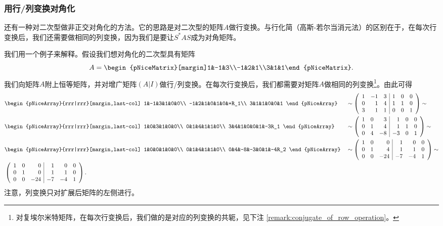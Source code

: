 \subsubsection{用行/列变换对角化}

还有一种对二次型做非正交对角化的方法。它的思路是对二次型的矩阵$A$做行变换。与行化简（高斯-若尔当消元法）的区别在于，在每次行变换后，我们还需要做相同的列变换，因为我们是要让$S^*AS$成为对角矩阵。

我们用一个例子来解释。假设我们想对角化的二次型具有矩阵\[A=\begin{pNiceMatrix}[margin]1&-1&3\\-1&2&1\\3&1&1\end{pNiceMatrix}.\]
我们向矩阵$A$附上恒等矩阵，并对增广矩阵$(A|I)$做行/列变换。在每次行变换后，我们都需要对矩阵$A$做相同的列变换\footnote{对复埃尔米特矩阵，在每次行变换后，我们做的是对应的列变换的共轭，见下注 \ref{remark:conjugate_of_row_operation}。}。由此可得
\begin{align*}
    &\begin{pNiceArray}{rrr|rrr}[margin,last-col]
  1&-1&3&1&0&0\\
  -1&2&1&0&1&0&+R_1\\
  3&1&1&0&0&1
\end{pNiceArray}  &&\sim \left(
  \begin{array}{rrr|rrr}
      1&-1&3&1&0&0\\
      0&1&4&1&1&0\\
      3&1&1&0&0&1
    \end{array}
  \right)\sim\\
    &\begin{pNiceArray}{rrr|rrr}[margin,last-col]
  1&0&3&1&0&0\\
  0&1&4&1&1&0\\
  3&4&1&0&0&1&-3R_1
\end{pNiceArray}  &&\sim \left(
  \begin{array}{rrr|rrr}
      1&0&3&1&0&0\\
      0&1&4&1&1&0\\
      0&4&-8&-3&0&1
    \end{array}
  \right)\sim\\
  &\begin{pNiceArray}{rrr|rrr}[margin,last-col]
  1&0&0&1&0&0\\
    0&1&4&1&1&0\\
    0&4&-8&-3&0&1&-4R_2
\end{pNiceArray}  &&\sim \left(
  \begin{array}{rrr|rrr}
      {1}&{0}&{0}&{1}&{0}&{0}\\
      {0}&{1}&{4}&{1}&{1}&{0}\\
      {0}&{0}&{-24}&{-7}&{-4}&{1}
    \end{array}
  \right)\sim\\
  &\left(\begin{array}{rrr|rrr}
  1&0&0&1&0&0\\0&1&0&1&1&0\\0&0&-24&-7&-4&1
  \end{array}\right).&&
\end{align*}
注意，列变换只对扩展后矩阵的左侧进行。

